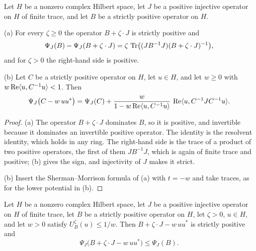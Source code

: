 \begin{lemma}
\label{lem:upper-potential-change}
\leanok
{}
Let $H$ be a nonzero complex Hilbert space, let $J$ be a positive injective operator on $H$
of finite trace, and let $B$ be a strictly positive operator on $H$.

(a) For every $\zeta \geq 0$ the operator $B + \zeta \cdot J$ is strictly positive and
\[
  \Psi_J(B) - \Psi_J(B + \zeta \cdot J)
    = \zeta \, \operatorname{Tr} \bigl( (J B^{-1} J) (B + \zeta \cdot J)^{-1} \bigr),
\]
and for $\zeta > 0$ the right-hand side is positive.

(b) Let $C$ be a strictly positive operator on $H$, let $u \in H$, and let $w \geq 0$ with
$w \operatorname{Re} \langle u, C^{-1} u \rangle < 1$. Then
\[
  \Psi_J \bigl( C - w \, u u^* \bigr)
    = \Psi_J(C)
      + \frac{w}{1 - w \operatorname{Re} \langle u, C^{-1} u \rangle} \,
        \operatorname{Re} \langle u, C^{-1} J C^{-1} u \rangle .
\]
\end{lemma}

\begin{proof}
\leanok
{}
(a) The operator $B + \zeta \cdot J$ dominates $B$, so it is positive, and invertible
because it dominates an invertible positive operator. The identity is the resolvent
identity, which holds in any ring. The right-hand side is the trace of a product of two
positive operators, the first of them $J B^{-1} J$, which is again of finite trace and
positive; (b) gives the sign, and injectivity of $J$ makes it
strict.

(b) Insert the Sherman--Morrison formula of (a) with
$t = -w$ and take traces, as for the lower potential in
(b).
\end{proof}

\begin{lemma}
\label{lem:upper-barrier}
\leanok
{}
Let $H$ be a nonzero complex Hilbert space, let $J$ be a positive injective operator on $H$
of finite trace, let $B$ be a strictly positive operator on $H$, let $\zeta > 0$,
$u \in H$, and let $w > 0$ satisfy $U_B^{\zeta}(u) \leq 1/w$. Then
$B + \zeta \cdot J - w \, u u^*$ is strictly positive and
\[
  \Psi_J \bigl( B + \zeta \cdot J - w \, u u^* \bigr) \leq \Psi_J(B).
\]
\end{lemma}

